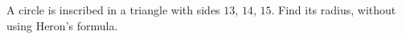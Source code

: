 A circle is inscribed in a triangle with sides $13$, $14$, $15$. Find its radius, without using Heron's formula.
